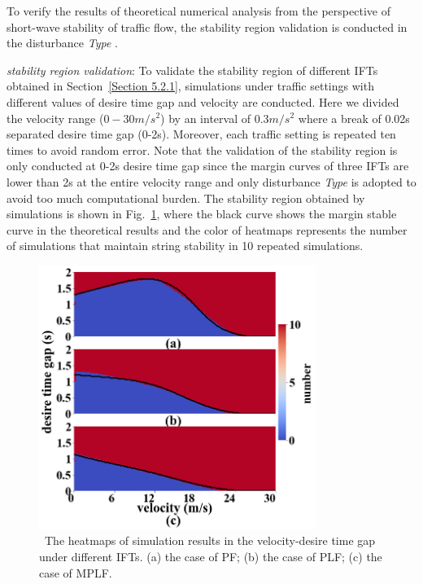 \documentclass[journal]{IEEEtran}
\begin{document}

To verify the results of theoretical numerical analysis from the perspective of short-wave stability of traffic flow, the stability region validation is conducted in the disturbance \textit{Type \uppercase\expandafter{}}. 


\textit{stability region validation}: To validate the stability region of different IFTs obtained in Section~\ref{Section 5.2.1}, simulations under traffic settings with different values of desire time gap and velocity are conducted. Here we divided the velocity range ($0-30 m/s^2$) by an interval of $0.3 m/s^2$ where a break of 0.02s separated desire time gap (0-2s). Moreover, each traffic setting is repeated ten times to avoid random error. Note that the validation of the stability region is only conducted at 0-2s desire time gap since the margin curves of three IFTs are lower than 2s at the entire velocity range and only disturbance \textit{Type \uppercase\expandafter{}} is adopted to avoid too much computational burden. The stability region obtained by simulations is shown in Fig.~\ref{Figure5.2.3}, where the black curve shows the margin stable curve in the theoretical results and the color of heatmaps represents the number of simulations that maintain string stability in 10 repeated simulations.


\begin{figure}
  \includegraphics[width=9cm]{figextend1.png}
  \caption{~The heatmaps of simulation results in the velocity-desire time gap under different IFTs. (a) the case of PF; (b) the case of PLF; (c) the case of MPLF.} 
  \label{Figure5.2.3}
\end{figure}
\end{document}

